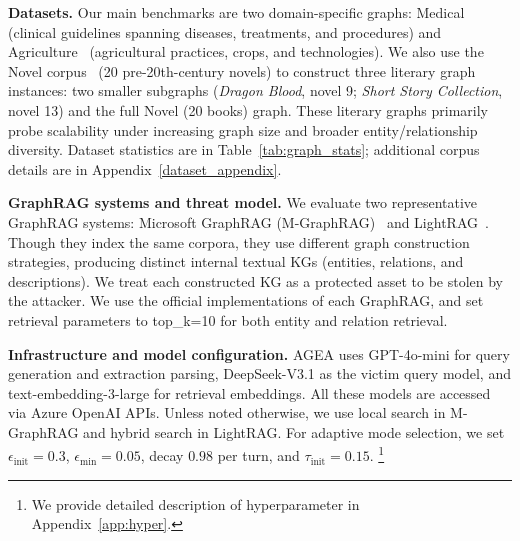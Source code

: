 \noindent\textbf{Datasets.}
Our main benchmarks are two domain-specific graphs: Medical~\cite{xiao2025graphrag} (clinical guidelines spanning diseases, treatments, and procedures) and Agriculture~\cite{zhou2025depth} (agricultural practices, crops, and technologies). We also use the Novel corpus~\cite{xiao2025graphrag} (20 pre-20th-century novels) to construct three literary graph instances: two smaller subgraphs (\emph{Dragon Blood}, novel 9; \emph{Short Story Collection}, novel 13) and the full Novel (20 books) graph. These literary graphs primarily probe scalability under increasing graph size and broader entity/relationship diversity. Dataset statistics are in Table~\ref{tab:graph_stats}; additional corpus details are in Appendix~\ref{dataset_appendix}.%

\noindent\textbf{GraphRAG systems and threat model.}
We evaluate two representative GraphRAG systems: Microsoft GraphRAG (M-GraphRAG)~\cite{edge2024local} and LightRAG~\cite{guo2024lightrag}. 
Though they index the same corpora, they use different graph construction strategies, producing distinct internal textual KGs (entities, relations, and descriptions). We treat each constructed KG as a protected asset to be stolen by the attacker. We use the official implementations of each GraphRAG, and set retrieval parameters to top\_k=10 for both entity and relation retrieval.

\noindent\textbf{Infrastructure and model configuration.}
AGEA uses GPT-4o-mini for query generation and extraction parsing, DeepSeek-V3.1 as the victim query model, and text-embedding-3-large for retrieval embeddings. All these models are accessed via Azure OpenAI APIs. Unless noted otherwise, we use local search in M-GraphRAG and hybrid search in LightRAG. For adaptive mode selection, we set $\epsilon_{\text{init}}{=}0.3$, $\epsilon_{\min}{=}0.05$, decay $0.98$ per turn, and $\tau_{\text{init}}{=}0.15$. %
\footnote{We provide detailed description of hyperparameter in Appendix~\ref{app:hyper}.}



